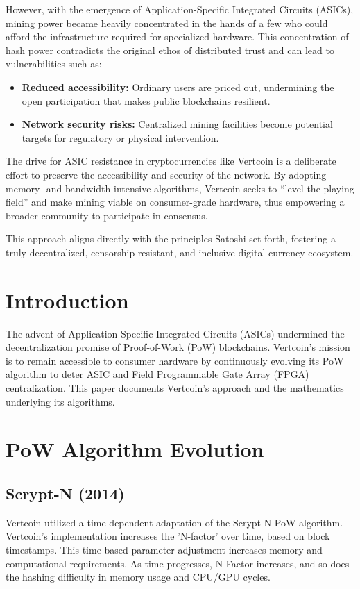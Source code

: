 \documentclass[12pt]{article}
\begin{document}
However, with the emergence of Application-Specific Integrated Circuits (ASICs), mining power became heavily concentrated in the hands of a few who could afford the infrastructure required for specialized hardware. This concentration of hash power contradicts the original ethos of distributed trust and can lead to vulnerabilities such as:

\begin{itemize}
    \item \textbf{Reduced accessibility:} Ordinary users are priced out, undermining the open participation that makes public blockchains resilient.
    \item \textbf{Network security risks:} Centralized mining facilities become potential targets for regulatory or physical intervention.
\end{itemize}

The drive for ASIC resistance in cryptocurrencies like Vertcoin is a deliberate effort to preserve the accessibility and security of the network. By adopting memory- and bandwidth-intensive algorithms, Vertcoin seeks to ``level the playing field'' and make mining viable on consumer-grade hardware, thus empowering a broader community to participate in consensus.

This approach aligns directly with the principles Satoshi set forth, fostering a truly decentralized, censorship-resistant, and inclusive digital currency ecosystem.

\section{Introduction}

The advent of Application-Specific Integrated Circuits (ASICs) undermined the decentralization promise of Proof-of-Work (PoW) blockchains. Vertcoin’s mission is to remain accessible to consumer hardware by continuously evolving its PoW algorithm to deter ASIC and Field Programmable Gate Array (FPGA) centralization. This paper documents Vertcoin's approach and the mathematics underlying its algorithms.

\section{PoW Algorithm Evolution}

\subsection{Scrypt-N (2014)}
Vertcoin utilized a time-dependent adaptation of the Scrypt-N PoW algorithm. Vertcoin’s implementation increases the 'N-factor' over time, based on block timestamps. This time-based parameter adjustment increases memory and computational requirements. As time progresses, N-Factor increases, and so does the hashing difficulty in memory usage and CPU/GPU cycles.
\end{document}
